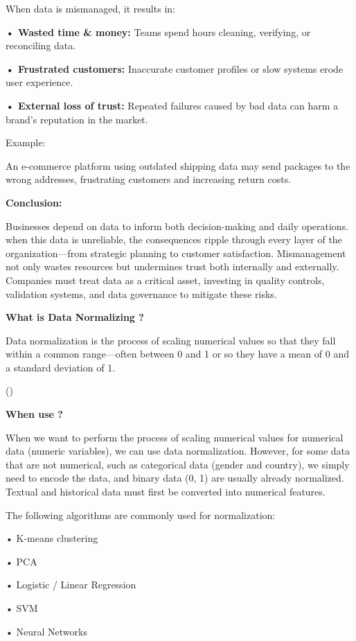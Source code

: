 \documentclass[
  man,
  floatsintext,
  longtable,
  nolmodern,
  notxfonts,
  notimes,
  colorlinks=true,linkcolor=blue,citecolor=blue,urlcolor=blue]{apa7}
\begin{document}
When data is mismanaged, it results in:

\textbf{• Wasted time \& money:} Teams spend hours cleaning, verifying,
or reconciling data.

\textbf{• Frustrated customers:} Inaccurate customer profiles or slow
systems erode user experience.

\textbf{• External loss of trust:} Repeated failures caused by bad data
can harm a brand's reputation in the market.

Example:

An e-commerce platform using outdated shipping data may send packages to
the wrong addresses, frustrating customers and increasing return costs.

\textbf{Conclusion:}

Businesses depend on data to inform both decision-making and daily
operations. when this data is unreliable, the consequences ripple
through every layer of the organization---from strategic planning to
customer satisfaction. Mismanagement not only wastes resources but
undermines trust both internally and externally. Companies must treat
data as a critical asset, investing in quality controls, validation
systems, and data governance to mitigate these risks.

\textbf{What is Data Normalizing ?}

Data normalization is the process of scaling numerical values so that
they fall within a common range---often between 0 and 1 or so they have
a mean of 0 and a standard deviation of 1.

()

\textbf{When use ?}

When we want to perform the process of scaling numerical values for
numerical data (numeric variables), we can use data normalization.
However, for some data that are not numerical, such as categorical data
(gender and country), we simply need to encode the data, and binary data
(0, 1) are usually already normalized. Textual and historical data must
first be converted into numerical features.

The following algorithms are commonly used for normalization:

• K-means clustering

• PCA

• Logistic / Linear Regression

• SVM

• Neural Networks
\end{document}
